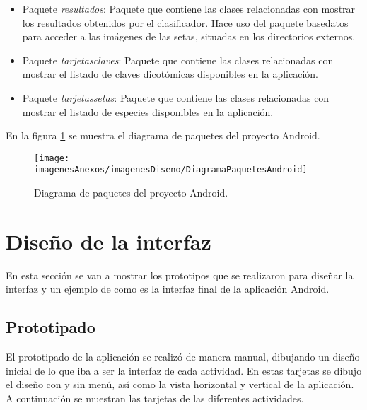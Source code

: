 \begin{itemize}
	\item Paquete \textit{resultados}: Paquete que contiene las clases relacionadas con mostrar los resultados obtenidos por el clasificador. Hace uso del paquete basedatos para acceder a las imágenes de las setas, situadas en los directorios externos.
	
	
	\item Paquete \textit{tarjetasclaves}: Paquete que contiene las clases relacionadas con mostrar el listado de claves dicotómicas disponibles en la aplicación.
	
	
	\item Paquete \textit{tarjetassetas}: Paquete que contiene las clases relacionadas con mostrar el listado de especies disponibles en la aplicación.
	
\end{itemize}

En la figura \ref{figDiagramaPaquetesAndroid} se muestra el diagrama de paquetes del proyecto Android. 
\begin{figure}[h]
    \begin{center}%
        \begin{center}%
          \texttt{[image: imagenesAnexos/imagenesDiseno/DiagramaPaquetesAndroid]}%
          \caption{Diagrama de paquetes del proyecto Android.}%
          \label{figDiagramaPaquetesAndroid}%
        \end{center}%
  	\end{center}%
\end{figure}%

\section{Diseño de la interfaz}

En esta sección se van a mostrar los prototipos que se realizaron para diseñar la interfaz y un ejemplo de como es la interfaz final de la aplicación Android.

\subsection{Prototipado}

El prototipado de la aplicación se realizó de manera manual, dibujando un diseño inicial de lo que iba a ser la interfaz de cada actividad. En estas tarjetas se dibujo el diseño con y sin menú, así como la vista horizontal y vertical de la aplicación. A continuación se muestran las tarjetas de las diferentes actividades.

